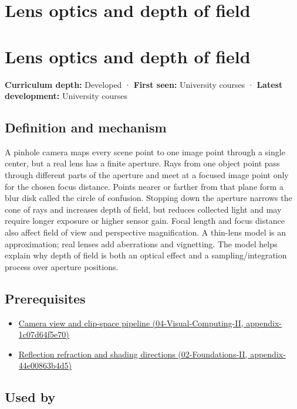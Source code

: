 \hypertarget{appendix-21f8456e2629}{}
\section*{Lens optics and depth of field}
\section{Lens optics and depth of field}\label{lens-optics-and-depth-of-field}

\textbf{Curriculum depth:} Developed · \textbf{First seen:} University courses · \textbf{Latest development:} University courses

\subsection{Definition and mechanism}\label{definition-and-mechanism}

A pinhole camera maps every scene point to one image point through a single center, but a real lens has a finite aperture. Rays from one object point pass through different parts of the aperture and meet at a focused image point only for the chosen focus distance. Points nearer or farther from that plane form a blur disk called the circle of confusion. Stopping down the aperture narrows the cone of rays and increases depth of field, but reduces collected light and may require longer exposure or higher sensor gain. Focal length and focus distance also affect field of view and perspective magnification. A thin-lens model is an approximation; real lenses add aberrations and vignetting. The model helps explain why depth of field is both an optical effect and a sampling/integration process over aperture positions.

\subsection{Prerequisites}\label{prerequisites}

\begin{itemize}
\tightlist
\item
  \href{}{Camera view and clip-space pipeline (04-Visual-Computing-II, appendix-1c07d64f5e70)}
\item
  \href{}{Reflection refraction and shading directions (02-Foundations-II, appendix-44e00863b4d5)}
\end{itemize}

\subsection{Used by}\label{used-by}

